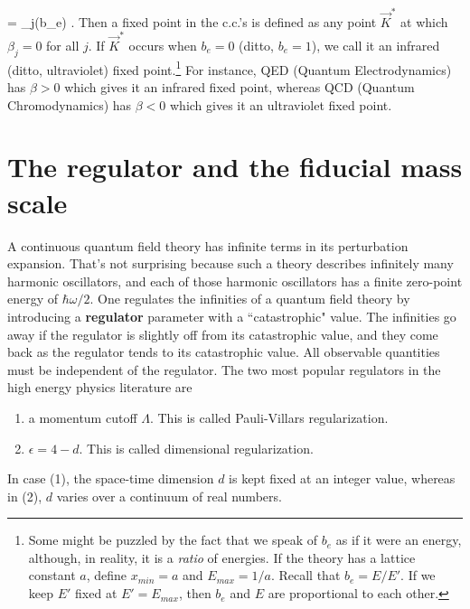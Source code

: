 \documentclass[12pt]{article}
\begin{document}
\beq
{} = \beta_j(b_e)
\;.
\label{eq-dif-kj}
\eeq
Then a fixed point
in the c.c.'s is defined as
any point $\vec{K}^*$
at which $\beta_j=0$
for all $j$.
If $\vec{K}^*$ occurs
when $b_e=0$ (ditto, $b_e=1$),
we call it an infrared (ditto, ultraviolet)
fixed point.\footnote{Some
might be puzzled
by the fact that
we speak of $b_e$
as if it were an energy,
although, in reality, it is
a {\it ratio} of energies.
If the theory has a lattice
constant $a$, define $x_{min} =a$
and $E_{max} = 1/a$. Recall
that $b_e= E/E'$. If we
keep $E'$ fixed at $E'=E_{max}$,
then $b_e$
and $E$ are proportional to each
other.}
For instance, QED (Quantum Electrodynamics)
has $\beta>0$ which gives it
an infrared fixed point,
whereas QCD (Quantum Chromodynamics)
has $\beta<0$ which gives it an ultraviolet
fixed point.

\section{The regulator and the fiducial
mass scale}
\label{sec-regulator}

A continuous
quantum field
theory has
infinite
terms in its perturbation
expansion. That's
not surprising because
such a theory
describes infinitely many
harmonic
oscillators, and each of
those harmonic oscillators  has a
finite zero-point energy of $\hbar\omega/2$.
One regulates the infinities
of a quantum field theory
by introducing a \textbf{regulator}
parameter with a ``catastrophic" value.
The
infinities go away if
the regulator is slightly
off from its catastrophic
value, and they come back as
 the regulator
tends to its catastrophic
value.  All
observable
quantities must
be independent of the regulator.
The two most popular
regulators in the high
energy physics literature
are
\begin{enumerate}
\item
a momentum cutoff $\Lambda$. This
is called Pauli-Villars regularization.
\item
$\epsilon = 4 -d$. This is called
dimensional regularization.
\end{enumerate}

In case (1), the space-time
dimension $d$ is kept
fixed at an integer value, whereas
in (2), $d$ varies
over a continuum of real
numbers.
\end{document}
